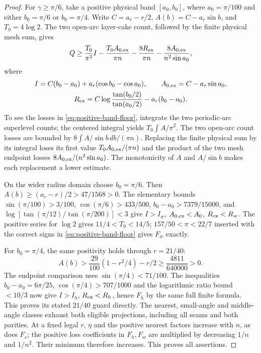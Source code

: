 \begin{proof}
For $\gamma\geq\pi/6$, take a positive physical band
$[a_0,b_0]$, where $a_0=\pi/100$ and either $b_0=\pi/6$ or
$b_0=\pi/4$. Write $C=a_r-r/2$,
$A(b)=C-a_r\sin b$, and $T_0=4\log2$. The two open-arc
layer-cake count, followed by the finite physical mesh sum, gives
\begin{equation}\label{eq:positive-band-floor}
 Q\geq\frac{T_0}{\pi^2}I-\frac{T_0A_{0,\rm ex}}{\pi n}
       -\frac{8R_{\rm ex}}{\pi n}
       -\frac{8A_{0,\rm ex}}{n^2\sin a_0},
\end{equation}
where
\begin{gather*}
 I=C(b_0-a_0)+a_r(\cos b_0-\cos a_0),\qquad
 A_{0,\rm ex}=C-a_r\sin a_0,\\
 R_{\rm ex}=C\log\frac{\tan(b_0/2)}{\tan(a_0/2)}-a_r(b_0-a_0).
\end{gather*}
To see the losses in \eqref{eq:positive-band-floor}, integrate the
two periodic-arc superlevel counts; the centered integral yields
$T_0\int A/\pi^2$. The two open-arc count losses are bounded by
$8\int A/\sin b\,db/(\pi n)$. Replacing the finite physical sum by
its integral loses its first value $T_0A_{0,\rm ex}/(\pi n)$
and the product of the two mesh endpoint losses
$8A_{0,\rm ex}/(n^2\sin a_0)$. The monotonicity of $A$ and
$A/\sin b$ makes each replacement a lower estimate.

On the wider radius domain choose $b_0=\pi/6$.
Then $A(b)\geq(a_r-r)/2>47/1568>0$.
The elementary bounds
$\sin(\pi/100)>3/100$, $\cos(\pi/6)>433/500$,
$b_0-a_0>7379/15000$, and
$\log[\tan(\pi/12)/\tan(\pi/200)]<3$
give $I>I_w$, $A_{0,\rm ex}<A_0$, $R_{\rm ex}<R_w$.
The positive series for $\log2$ gives $11/4<T_0<14/5$;
$157/50<\pi<22/7$ inserted with the correct signs in
\eqref{eq:positive-band-floor} gives $F_w$ exactly.

For $b_0=\pi/4$, the same positivity holds through $r=21/40$:
\[
 A(b)>\frac{29}{100}(1-r^2/4)-r/2
       \geq\frac{4811}{640000}>0.
\]
The endpoint comparison uses $\sin(\pi/4)<71/100$.
The inequalities $b_0-a_0=6\pi/25$,
$\cos(\pi/4)>707/1000$ and the logarithmic ratio bound $<10/3$
now give $I>I_h$, $R_{\rm ex}<R_h$, hence $F_h$ by the same full
finite formula. This proves its stated $21/40$ guard directly.
The nearest, small-angle and middle-angle classes exhaust both
eligible projections, including all seams and both parities.
At a fixed legal $r$, $\eta$ and the positive nearest factors increase
with $n$, as does $F_s$; the positive loss coefficients in $F_h,F_w$
are multiplied by decreasing $1/n$ and $1/n^2$. Their minimum
therefore increases. This proves all assertions.
\end{proof}
